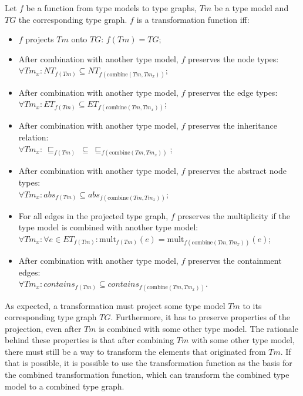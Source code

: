 \begin{defin}
\label{defin:transformation_framework:type_models_and_type_graphs:combining_transformation_functions:transformation_function_type_model_type_graph}
Let $f$ be a function from type models to type graphs, $Tm$ be a type model and $TG$ the corresponding type graph. $f$ is a transformation function iff:
\begin{itemize}
    \item $f$ projects $Tm$ onto $TG$: $f(Tm) = TG$;
    \item After combination with another type model, $f$ preserves the node types:\\$\forall Tm_x\!: NT_{f(Tm)} \subseteq NT_{f(\mathrm{combine}(Tm, Tm_x))}$;
    \item After combination with another type model, $f$ preserves the edge types:\\$\forall Tm_x\!: ET_{f(Tm)} \subseteq ET_{f(\mathrm{combine}(Tm, Tm_x))}$;
    \item After combination with another type model, $f$ preserves the inheritance relation:\\$\forall Tm_x\!:\ \sqsubseteq_{f(Tm)}\ \subseteq\ \sqsubseteq_{f(\mathrm{combine}(Tm, Tm_x))}$;
    \item After combination with another type model, $f$ preserves the abstract node types:\\$\forall Tm_x\!: abs_{f(Tm)} \subseteq abs_{f(\mathrm{combine}(Tm, Tm_x))}$;
    \item For all edges in the projected type graph, $f$ preserves the multiplicity if the type model is combined with another type model:\\$\forall Tm_x\!: \forall e \in ET_{f(Tm)}\!: \mathrm{mult}_{f(Tm)}(e) = \mathrm{mult}_{f(\mathrm{combine}(Tm, Tm_x))}(e)$;
    \item After combination with another type model, $f$ preserves the containment edges:\\$\forall Tm_x\!: contains_{f(Tm)} \subseteq contains_{f(\mathrm{combine}(Tm, Tm_x))}$.
\end{itemize}
\end{defin}

As expected, a transformation must project some type model $Tm$ to its corresponding type graph $TG$. Furthermore, it has to preserve properties of the projection, even after $Tm$ is combined with some other type model. The rationale behind these properties is that after combining $Tm$ with some other type model, there must still be a way to transform the elements that originated from $Tm$. If that is possible, it is possible to use the transformation function as the basis for the combined transformation function, which can transform the combined type model to a combined type graph.

